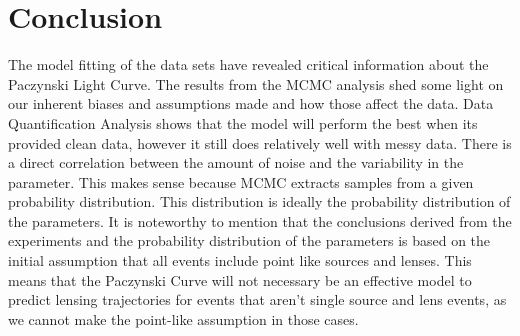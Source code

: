 \documentclass{article}
\begin{document}
\section{Conclusion}
The model fitting of the data sets have revealed critical information about the Paczynski Light Curve. The results from the MCMC analysis shed some light on our inherent biases and assumptions made and how those affect the data. Data Quantification Analysis shows that the model will perform the best when its provided clean data, however it still does relatively well with messy data. There is a direct correlation between the amount of noise and the variability in the parameter. This makes sense because MCMC extracts samples from a given probability distribution. This distribution is ideally the probability distribution of the parameters. It is noteworthy to mention that the conclusions derived from the experiments and the probability distribution of the parameters is based on the initial assumption that all events include point like sources and lenses. This means that  the Paczynski Curve will not necessary be an effective model to predict lensing trajectories for events that aren't single source and lens events, as we cannot make the point-like assumption in those cases.
\end{document}
